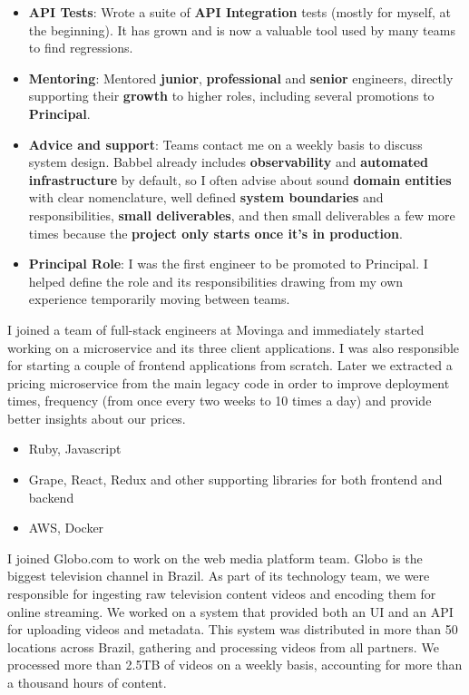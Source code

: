 \documentclass[10pt,a4paper,ragged2e,withhyper]{altacv}
\begin{document}
\begin{paracol}{2}
{\begin{itemize}
\item \textbf{API Tests}: Wrote a suite of \textbf{API Integration} tests (mostly for myself, at the beginning). It has grown and is now a valuable tool used by many teams to find regressions.
\item \textbf{Mentoring}: Mentored \textbf{junior}, \textbf{professional} and \textbf{senior} engineers, directly supporting their \textbf{growth} to higher roles, including several promotions to \textbf{Principal}.
\item \textbf{Advice and support}: Teams contact me on a weekly basis to discuss system design. Babbel already includes \textbf{observability} and \textbf{automated infrastructure} by default, so I often advise about sound \textbf{domain entities} with clear nomenclature, well defined \textbf{system boundaries} and responsibilities, \textbf{small deliverables}, and then small deliverables a few more times because the \textbf{project only starts once it's in production}.
\item \textbf{Principal Role}: I was the first engineer to be promoted to Principal. I helped define the role and its responsibilities drawing from my own experience temporarily moving between teams.
\end{itemize}
}

\divider


{\RaggedRight
I joined a team of full-stack engineers at Movinga and immediately started working on a microservice and its three client applications. I was also responsible for starting a couple of frontend applications from scratch. Later we extracted a pricing microservice from the main legacy code in order to improve deployment times, frequency (from once every two weeks to 10 times a day) and provide better insights about our prices.

\begin{itemize}
\item Ruby, Javascript
\item Grape, React, Redux and other supporting libraries for both frontend and backend
\item AWS, Docker
\end{itemize}
}

\divider


{\RaggedRight
I joined Globo.com to work on the web media platform team. Globo is the biggest television channel in Brazil. As part of its technology team, we were responsible for ingesting raw television content videos and encoding them for online streaming. We worked on a system that provided both an UI and an API for uploading videos and metadata. This system was distributed in more than 50 locations across Brazil, gathering and processing videos from all partners. We processed more than 2.5TB of videos on a weekly basis, accounting for more than a thousand hours of content.

}
\end{paracol}
\end{document}
